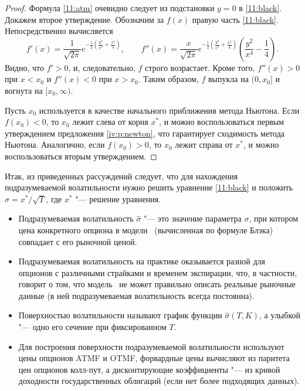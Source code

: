 \begin{proof}
Формула \eqref{11:atm} очевидно следует из подстановки $y=0$ в \eqref{11:black}.
Докажем второе утверждение.
Обозначим за $f(x)$ правую часть \eqref{11:black}.
Непосредственно вычисляется
\[
f'(x) = \frac{1}{\sqrt{2\pi}} e^{-\frac12\left(\frac{y^2}{x^2} + \frac{x^2}4\right)},\qquad
f''(x) = \frac{x}{\sqrt{2\pi}} e^{-\frac12\left(\frac{y^2}{x^2} + \frac{x^2}4\right)}
  \left(\frac{y^2}{x^4} - \frac14\right).
\]
Видно, что $f'>0$, и, следовательно, $f$ строго возрастает.
Кроме того, $f''(x) > 0$ при $x < x_0$ и $f''(x) < 0$ при $x > x_0$.
Таким образом, $f$ выпукла на $(0,x_0]$ и вогнута на $[x_0,\infty)$.

Пусть $x_0$ используется в качестве начального приближения метода Ньютона.
Если $f(x_0) < 0$, то $x_0$ лежит слева от корня $x^*$, и можно воспользоваться первым утверждением предложения \ref{iv:p:newton}, что гарантирует сходимость метода Ньютона.
Аналогично, если $f(x_0) > 0$, то $x_0$ лежит справа от $x^*$, и можно воспользоваться вторым утверждением.
\end{proof}

Итак, из приведенных рассуждений следует, что для нахождения подразумеваемой волатильности нужно решить уравнение \eqref{11:black} и  положить $\hat\sigma = x^*/\sqrt{T}$, где $x^*$ "--- решение уравнения. 




\summary
\begin{itemize}
\item Подразумеваемая волатильность $\hat\sigma$ "--- это значение параметра $\sigma$, при котором цена конкретного опциона в модели \bs\ (вычисленная по формуле Блэка) совпадает с его рыночной ценой.

\item Подразумеваемая волатильность на практике оказывается разной для опционов с различными страйками и временем экспирации, что, в частности, говорит о том, что модель \bs\ не может правильно описать реальные рыночные данные (в ней подразумеваемая волатильность всегда постоянна).

\item Поверхностью волатильности называют график функции $\hat\sigma(T,K)$, а улыбкой "--- одно его сечение при фиксированном $T$.

\item Для построения поверхности подразумеваемой волатильности используют цены опционов ATMF и OTMF, форвардные цены вычисляют из паритета цен опционов колл-пут, а дисконтирующие коэффициенты "--- из кривой доходности государственных облигаций (если нет более подходящих данных).
\end{itemize}
